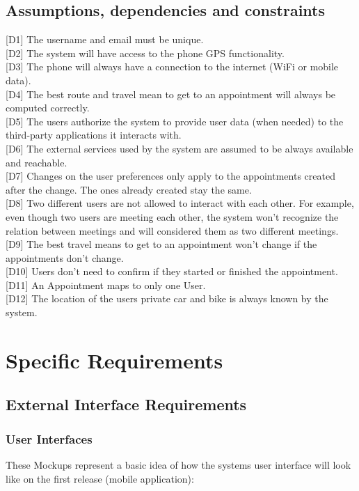 \documentclass[12pt]{article}
\begin{document}
\subsection{Assumptions, dependencies and constraints}
[D1] The username and email must be unique.\\{}
[D2] The system will have access to the phone GPS functionality.\\{}
[D3] The phone will always have a connection to the internet (WiFi or mobile data).\\{}
[D4] The best route and travel mean to get to an appointment will always be computed correctly.\\{}
[D5] The users authorize the system to provide user data (when needed) to the third-party applications it interacts with.\\{}
[D6] The external services used by the system are assumed to be always available and reachable.\\{}
[D7] Changes on the user preferences only apply to the appointments created after the change. The ones already created stay the same.\\{}
[D8] Two different users are not allowed to interact with each other. For example, even though two users are meeting each other, the system won't recognize the relation between meetings and will considered them as two different meetings.\\{}
[D9] The best travel means to get to an appointment won't change if the appointments don't change.\\{}
[D10] Users don't need to confirm if they started or finished the appointment.\\{}
[D11] An Appointment maps to only one User.\\{}
[D12] The location of the users private car and bike is always known by the system.\\{}


\section{Specific Requirements}

\subsection{External Interface Requirements}

\subsubsection{User Interfaces}
These Mockups represent a basic idea of how the systems user interface will look like on the first release (mobile application):
\end{document}
